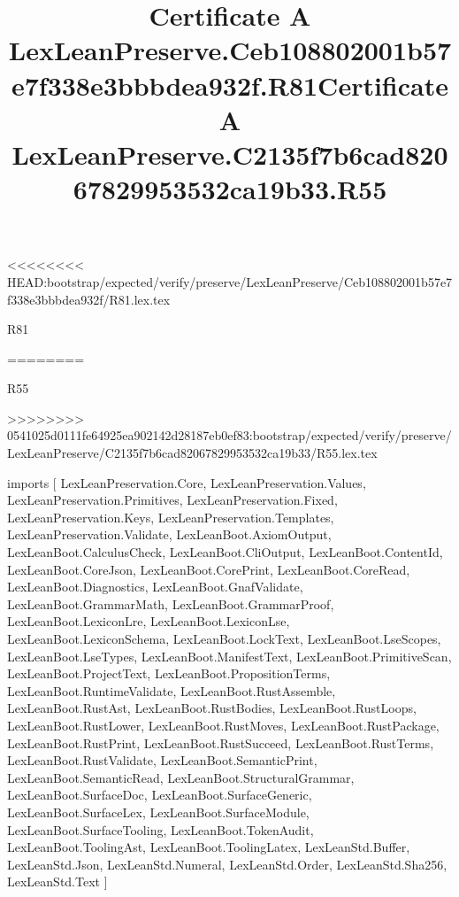 <<<<<<<< HEAD:bootstrap/expected/verify/preserve/LexLeanPreserve/Ceb108802001b57e7f338e3bbbdea932f/R81.lex.tex
\begin{lexlean}{R81}
\title{Certificate A LexLeanPreserve.Ceb108802001b57e7f338e3bbbdea932f.R81}
========
\begin{lexlean}{R55}
\title{Certificate A LexLeanPreserve.C2135f7b6cad82067829953532ca19b33.R55}
>>>>>>>> 0541025d0111fe64925ea902142d28187eb0ef83:bootstrap/expected/verify/preserve/LexLeanPreserve/C2135f7b6cad82067829953532ca19b33/R55.lex.tex
\begin{coremodule}
imports [
  LexLeanPreservation.Core,
  LexLeanPreservation.Values,
  LexLeanPreservation.Primitives,
  LexLeanPreservation.Fixed,
  LexLeanPreservation.Keys,
  LexLeanPreservation.Templates,
  LexLeanPreservation.Validate,
  LexLeanBoot.AxiomOutput,
  LexLeanBoot.CalculusCheck,
  LexLeanBoot.CliOutput,
  LexLeanBoot.ContentId,
  LexLeanBoot.CoreJson,
  LexLeanBoot.CorePrint,
  LexLeanBoot.CoreRead,
  LexLeanBoot.Diagnostics,
  LexLeanBoot.GnafValidate,
  LexLeanBoot.GrammarMath,
  LexLeanBoot.GrammarProof,
  LexLeanBoot.LexiconLre,
  LexLeanBoot.LexiconLse,
  LexLeanBoot.LexiconSchema,
  LexLeanBoot.LockText,
  LexLeanBoot.LseScopes,
  LexLeanBoot.LseTypes,
  LexLeanBoot.ManifestText,
  LexLeanBoot.PrimitiveScan,
  LexLeanBoot.ProjectText,
  LexLeanBoot.PropositionTerms,
  LexLeanBoot.RuntimeValidate,
  LexLeanBoot.RustAssemble,
  LexLeanBoot.RustAst,
  LexLeanBoot.RustBodies,
  LexLeanBoot.RustLoops,
  LexLeanBoot.RustLower,
  LexLeanBoot.RustMoves,
  LexLeanBoot.RustPackage,
  LexLeanBoot.RustPrint,
  LexLeanBoot.RustSucceed,
  LexLeanBoot.RustTerms,
  LexLeanBoot.RustValidate,
  LexLeanBoot.SemanticPrint,
  LexLeanBoot.SemanticRead,
  LexLeanBoot.StructuralGrammar,
  LexLeanBoot.SurfaceDoc,
  LexLeanBoot.SurfaceGeneric,
  LexLeanBoot.SurfaceLex,
  LexLeanBoot.SurfaceModule,
  LexLeanBoot.SurfaceTooling,
  LexLeanBoot.TokenAudit,
  LexLeanBoot.ToolingAst,
  LexLeanBoot.ToolingLatex,
  LexLeanStd.Buffer,
  LexLeanStd.Json,
  LexLeanStd.Numeral,
  LexLeanStd.Order,
  LexLeanStd.Sha256,
  LexLeanStd.Text
]


\end{coremodule}
\end{lexlean}
\end{lexlean}
